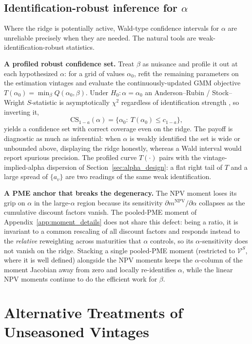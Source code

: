 \documentclass[11pt]{article}
\begin{document}
\subsection{Identification-robust inference for \texorpdfstring{\(\alpha\)}{alpha}}

Where the ridge is potentially active, Wald-type confidence intervals for \(\alpha\) are unreliable precisely when they are needed. The natural tools are weak-identification-robust statistics.

\textbf{A profiled robust confidence set.} Treat \(\beta\) as nuisance and profile it out at each hypothesized \(\alpha\): for a grid of values \(\alpha_0\), refit the remaining parameters on the estimation vintages and evaluate the continuously-updated GMM objective \(T(\alpha_0)=\min_{\beta}Q(\alpha_0,\beta)\). Under \(H_0:\alpha=\alpha_0\) an Anderson--Rubin / Stock--Wright \(S\)-statistic is asymptotically \(\chi^2\) regardless of identification strength \citep{StockWright2000}, so inverting it,
\[
\mathrm{CS}_{1-a}(\alpha)=\bigl\{\alpha_0:\ T(\alpha_0)\le c_{1-a}\bigr\},
\]
yields a confidence set with correct coverage even on the ridge. The payoff is diagnostic as much as inferential: when \(\alpha\) is weakly identified the set is wide or unbounded above, displaying the ridge honestly, whereas a Wald interval would report spurious precision. The profiled curve \(T(\cdot)\) pairs with the vintage-implied-alpha dispersion of Section~\ref{sec:alpha_design}: a flat right tail of \(T\) and a large spread of \(\{a_v\}\) are two readings of the same weak identification.

\textbf{A PME anchor that breaks the degeneracy.} The NPV moment loses its grip on \(\alpha\) in the large-\(\alpha\) region because its sensitivity \(\partial m^{\mathrm{NPV}}/\partial\alpha\) collapses as the cumulative discount factors vanish. The pooled-PME moment of Appendix~\ref{app:moment_details} does not share this defect: being a ratio, it is invariant to a common rescaling of all discount factors and responds instead to the \emph{relative} reweighting across maturities that \(\alpha\) controls, so its \(\alpha\)-sensitivity does not vanish on the ridge. Stacking a single pooled-PME moment (restricted to \(\mathcal V^S\), where it is well defined) alongside the NPV moments keeps the \(\alpha\)-column of the moment Jacobian away from zero and locally re-identifies \(\alpha\), while the linear NPV moments continue to do the efficient work for \(\beta\).

\section{Alternative Treatments of Unseasoned Vintages}
\label{app:unseasoned_alt}
\end{document}
